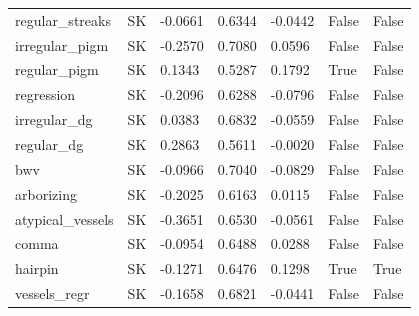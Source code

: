 \begin{tabular}{lllllll}
regular\_streaks & SK & -0.0661 & 0.6344 & -0.0442 & False & False \\
irregular\_pigm & SK & -0.2570 & 0.7080 & 0.0596 & False & False \\
regular\_pigm & SK & 0.1343 & 0.5287 & 0.1792 & True & False \\
regression & SK & -0.2096 & 0.6288 & -0.0796 & False & False \\
irregular\_dg & SK & 0.0383 & 0.6832 & -0.0559 & False & False \\
regular\_dg & SK & 0.2863 & 0.5611 & -0.0020 & False & False \\
bwv & SK & -0.0966 & 0.7040 & -0.0829 & False & False \\
arborizing & SK & -0.2025 & 0.6163 & 0.0115 & False & False \\
atypical\_vessels & SK & -0.3651 & 0.6530 & -0.0561 & False & False \\
comma & SK & -0.0954 & 0.6488 & 0.0288 & False & False \\
hairpin & SK & -0.1271 & 0.6476 & 0.1298 & True & True \\
vessels\_regr & SK & -0.1658 & 0.6821 & -0.0441 & False & False \\
\hline
\end{tabular}
